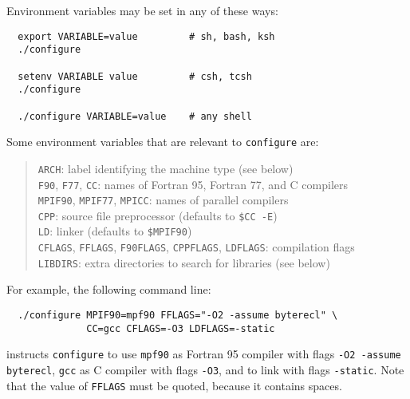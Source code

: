 \documentclass[12pt,a4paper]{article}
\begin{document}
Environment variables may be set in any of these ways:
\begin{verbatim}
  export VARIABLE=value         # sh, bash, ksh
  ./configure

  setenv VARIABLE value         # csh, tcsh
  ./configure

  ./configure VARIABLE=value    # any shell
\end{verbatim}
Some environment variables that are relevant to \texttt{configure} are:
\begin{quote}
  \texttt{ARCH}:
    label identifying the machine type (see below)\\
  \texttt{F90}, \texttt{F77}, \texttt{CC}:
    names of Fortran 95, Fortran 77, and C compilers\\
  \texttt{MPIF90}, \texttt{MPIF77}, \texttt{MPICC}:
    names of parallel compilers\\
  \texttt{CPP}:
    source file preprocessor (defaults to \texttt{\$CC -E})\\
  \texttt{LD}: linker (defaults to \texttt{\$MPIF90})\\
  \texttt{CFLAGS}, \texttt{FFLAGS}, \texttt{F90FLAGS},
    \texttt{CPPFLAGS}, \texttt{LDFLAGS}:
    compilation flags\\
  \texttt{LIBDIRS}:
    extra directories to search for libraries (see below)
\end{quote}
For example, the following command line:
\begin{verbatim}
  ./configure MPIF90=mpf90 FFLAGS="-O2 -assume byterecl" \
              CC=gcc CFLAGS=-O3 LDFLAGS=-static
\end{verbatim}
instructs \texttt{configure} to use \texttt{mpf90} as Fortran 95
compiler with flags \texttt{-O2 -assume byterecl},
\texttt{gcc} as C compiler with flags \texttt{-O3}, and to link with
flags \texttt{-static}.  Note that the value of \texttt{FFLAGS} must
be quoted, because it contains spaces.
\end{document}

